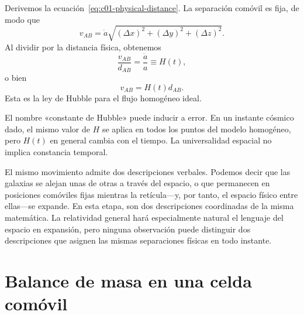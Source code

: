 Derivemos la ecuación~\eqref{eq:c01-physical-distance}. La separación comóvil es fija, de modo que
\begin{equation}
v_{AB}=\dot a\sqrt{(\Delta x)^2+(\Delta y)^2+(\Delta z)^2}.
\end{equation}
Al dividir por la distancia física, obtenemos
\begin{equation}
\frac{v_{AB}}{d_{AB}}=\frac{\dot a}{a}\equiv H(t),
\label{eq:c01-hubble-parameter}
\end{equation}
o bien
\begin{equation}
\boxed{v_{AB}=H(t)d_{AB}.}
\label{eq:c01-hubble-law}
\end{equation}
Esta es la ley de Hubble para el flujo homogéneo ideal.

El nombre «constante de Hubble» puede inducir a error. En un instante cósmico dado, el mismo valor de \(H\) se aplica en todos los puntos del modelo homogéneo, pero \(H(t)\) en general cambia con el tiempo. La universalidad espacial no implica constancia temporal.

\begin{classroomqa}
\end{classroomqa}

El mismo movimiento admite dos descripciones verbales. Podemos decir que las galaxias se alejan unas de otras a través del espacio, o que permanecen en posiciones comóviles fijas mientras la retícula---y, por tanto, el espacio físico entre ellas---se expande. En esta etapa, son dos descripciones coordinadas de la misma matemática. La relatividad general hará especialmente natural el lenguaje del espacio en expansión, pero ninguna observación puede distinguir dos descripciones que asignen las mismas separaciones físicas en todo instante.

\section{Balance de masa en una celda comóvil}

